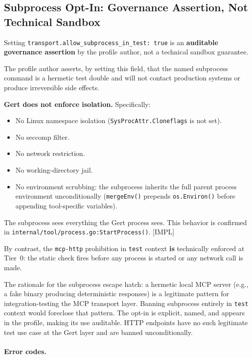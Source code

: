 \subsection{Subprocess Opt-In: Governance Assertion, Not Technical Sandbox}
\label{subsec:rp-subprocess-assertion}

Setting \texttt{transport.allow\_subprocess\_in\_test: true} is an
\textbf{auditable governance assertion} by the profile author, not a technical
sandbox guarantee.

The profile author asserts, by setting this field, that the named subprocess
command is a hermetic test double and will not contact production systems or
produce irreversible side effects.

\textbf{Gert does not enforce isolation.}  Specifically:
\begin{itemize}[noitemsep]
  \item No Linux namespace isolation (\texttt{SysProcAttr.Cloneflags} is not
        set).
  \item No seccomp filter.
  \item No network restriction.
  \item No working-directory jail.
  \item No environment scrubbing: the subprocess inherits the full parent
        process environment unconditionally
        (\texttt{mergeEnv()} prepends \texttt{os.Environ()} before
        appending tool-specific variables).
\end{itemize}

The subprocess sees everything the Gert process sees.  This behavior is
confirmed in \texttt{internal/tool/process.go:StartProcess()}.  [IMPL]

By contrast, the \texttt{mcp-http} prohibition in \texttt{test} context
\textbf{is} technically enforced at Tier~0: the static check fires before any
process is started or any network call is made.

The rationale for the subprocess escape hatch: a hermetic local MCP server
(e.g., a fake binary producing deterministic responses) is a legitimate pattern
for integration-testing the MCP transport layer.  Banning subprocess entirely
in \texttt{test} context would foreclose that pattern.  The opt-in is explicit,
named, and appears in the profile, making its use auditable.  HTTP endpoints
have no such legitimate test use case at the Gert layer and are banned
unconditionally.

\paragraph{Error codes.}

